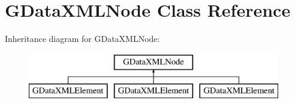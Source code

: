 \hypertarget{interface_g_data_x_m_l_node}{
\section{GDataXMLNode Class Reference}
\label{interface_g_data_x_m_l_node}
}
Inheritance diagram for GDataXMLNode:\begin{figure}[H]
\begin{center}
\leavevmode
\includegraphics[height=2.000000cm]{interface_g_data_x_m_l_node}
\end{center}
\end{figure}
